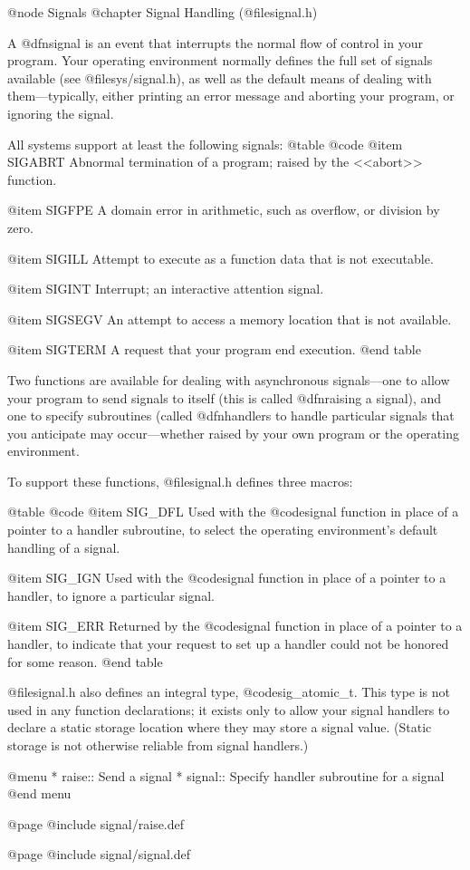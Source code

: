 @node Signals
@chapter Signal Handling (@file{signal.h})

A @dfn{signal} is an event that interrupts the normal flow of control
in your program.  Your operating environment normally defines the full
set of signals available (see @file{sys/signal.h}), as well as the
default means of dealing with them---typically, either printing an
error message and aborting your program, or ignoring the signal.

All systems support at least the following signals:
@table @code
@item SIGABRT
Abnormal termination of a program; raised by the <<abort>> function.

@item SIGFPE
A domain error in arithmetic, such as overflow, or division by zero.

@item SIGILL
Attempt to execute as a function data that is not executable.

@item SIGINT
Interrupt; an interactive attention signal.

@item SIGSEGV
An attempt to access a memory location that is not available.

@item SIGTERM
A request that your program end execution.
@end table

Two functions are available for dealing with asynchronous
signals---one to allow your program to send signals to itself (this is
called @dfn{raising} a signal), and one to specify subroutines (called
@dfn{handlers} to handle particular signals that you anticipate may
occur---whether raised by your own program or the operating environment.

To support these functions, @file{signal.h} defines three macros:

@table @code
@item SIG_DFL
Used with the @code{signal} function in place of a pointer to a
handler subroutine, to select the operating environment's default
handling of a signal.

@item SIG_IGN
Used with the @code{signal} function in place of a pointer to a
handler, to ignore a particular signal.

@item SIG_ERR
Returned by the @code{signal} function in place of a pointer to a
handler, to indicate that your request to set up a handler could not
be honored for some reason.
@end table

@file{signal.h} also defines an integral type, @code{sig_atomic_t}.
This type is not used in any function declarations; it exists only to
allow your signal handlers to declare a static storage location where
they may store a signal value.  (Static storage is not otherwise
reliable from signal handlers.)

@menu
* raise::   Send a signal
* signal::  Specify handler subroutine for a signal
@end menu

@page
@include signal/raise.def

@page
@include signal/signal.def
